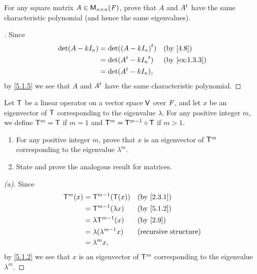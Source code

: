 \begin{ex}\label{ex:5.1.14}
	For any square matrix \(A \in \ms[n][n][\F]\), prove that \(A\) and \({A}^{t}\) have the same characteristic polynomial (and hence the same eigenvalues).
\end{ex}

\begin{proof}[]
	Since
	\begin{align*}
		\det(A - k I_n) & = \det(\tp{(A - k I_n)})    &  & \by{4.8}      \\
		                & = \det(\tp{A} - k \tp{I_n}) &  & \by{ex:1.3.3} \\
		                & = \det(\tp{A} - k I_n),
	\end{align*}
	by \cref{5.1.5} we see that \(A\) and \({A}^{t}\) have the same characteristic polynomial.
\end{proof}

\begin{ex}\label{ex:5.1.15}
	Let \(\mathsf{T}\) be a linear operator on a vector space \(\mathsf{V}\) over \(\mathit{F}\), and let \(x\) be an eigenvector of \(\mathsf{T}\) corresponding to the eigenvalue \(\lambda\).
	For any positive integer \(m\), we define \(\mathsf{T}^m = \mathsf{T}\) if \(m = 1\) and \(\mathsf{T}^m = \mathsf{T}^{m - 1} \circ \mathsf{T}\) if \(m > 1\).
	\begin{enumerate}
		\item For any positive integer \(m\), prove that \(x\) is an eigenvector of \(\mathsf{T}^m\) corresponding to the eigenvalue \(\lambda^m\).
		\item State and prove the analogous result for matrices.
	\end{enumerate}
\end{ex}

\begin{proof}[(a)]
	Since
	\begin{align*}
		\T^m(x) & = \T^{m - 1}(\T(x))           &  & \by{2.3.1}                   \\
		        & = \T^{m - 1}(\lambda x)       &  & \by{5.1.2}                   \\
		        & = \lambda \T^{m - 1}(x)       &  & \by{2.9}                     \\
		        & = \lambda (\lambda^{m - 1} x) &  & \text{(recursive structure)} \\
		        & = \lambda^m x,
	\end{align*}
	by \cref{5.1.2} we see that \(x\) is an eigenvector of \(\mathsf{T}^m\) corresponding to the eigenvalue \(\lambda^m\).
\end{proof}

